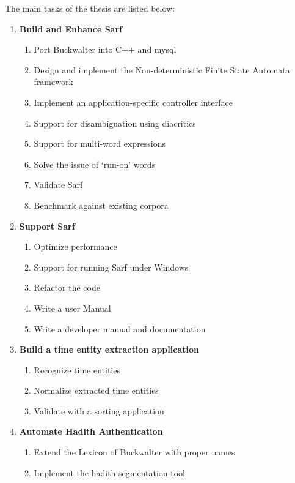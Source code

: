 \documentclass[a4,12pt]{report}
\begin{document}
The main tasks of the thesis are listed below: \\
\begin{enumerate}
\item \textbf{Build and Enhance Sarf} \label{I:Sarf}
	\begin{enumerate}
	\item Port Buckwalter into C++ and mysql \label{I:portBuckwalter}
	\item Design and implement the Non-deterministic Finite State Automata framework \label{I:ndfsa}
	\item Implement an application-specific controller interface \label{I:applicationController}
	\item Support for disambiguation using diacritics \label{I:diacritics}
	\item Support for multi-word expressions \label{I:multiword}
	\item Solve the issue of `run-on' words \label{I:runon}
	\item Validate Sarf \label{I:validateSarf}
	\item Benchmark against existing corpora \label{I:benchMark}
	\end{enumerate}
\item \textbf{Support Sarf}
	\begin{enumerate}
	\item Optimize performance \label{I:optimizeSarf}
	\item Support for running Sarf under Windows \label{I:Sarfo}
	\item Refactor the code
	\item Write a user Manual
	\item Write a developer manual and documentation
	\end{enumerate}
\item \textbf{Build a time entity extraction application}
	\begin{enumerate}
	\item Recognize time entities
	\item Normalize extracted time entities
	\item Validate with a sorting application
	\end{enumerate}
\item \textbf{Automate Hadith Authentication}
	\begin{enumerate}
	\item Extend the Lexicon of Buckwalter with proper names 
	\item Implement the hadith segmentation tool

\end{enumerate}
\end{enumerate}
\end{document}
